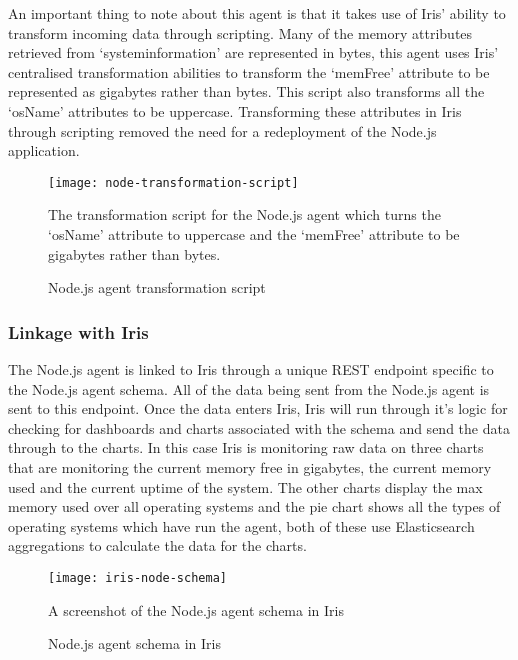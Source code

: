 \documentclass[12pt,a4paper,titlepage]{report}
\begin{document}
An important thing to note about this agent is that it takes use of Iris' ability to transform incoming data through scripting. Many of the memory attributes retrieved from `systeminformation' are represented in bytes, this agent uses Iris' centralised transformation abilities to transform the `memFree' attribute to be represented as gigabytes rather than bytes. This script also transforms all the `osName' attributes to be uppercase. Transforming these attributes in Iris through scripting removed the need for a redeployment of the Node.js application.

\begin{figure}[H]
\begin{tcolorbox}
\begin{center}
\texttt{[image: node-transformation-script]}
\end{center}
The transformation script for the Node.js agent which turns the `osName' attribute to uppercase and the `memFree' attribute to be gigabytes rather than bytes.
\end{tcolorbox}
\caption{Node.js agent transformation script}
\end{figure}

\subsubsection{Linkage with Iris}
The Node.js agent is linked to Iris through a unique REST endpoint specific to the Node.js agent schema. All of the data being sent from the Node.js agent is sent to this endpoint. Once the data enters Iris, Iris will run through it's logic for checking for dashboards and charts associated with the schema and send the data through to the charts. 
In this case Iris is monitoring raw data on three charts that are monitoring the current memory free in gigabytes, the current memory used and the current uptime of the system. The other charts display the max memory used over all operating systems and the pie chart shows all the types of operating systems which have run the agent, both of these use Elasticsearch aggregations to calculate the data for the charts.

\begin{figure}[H]
\begin{tcolorbox}
\begin{center}
\texttt{[image: iris-node-schema]}
\end{center}
A screenshot of the Node.js agent schema in Iris
\end{tcolorbox}
\caption{Node.js agent schema in Iris}
\end{figure}
\end{document}
